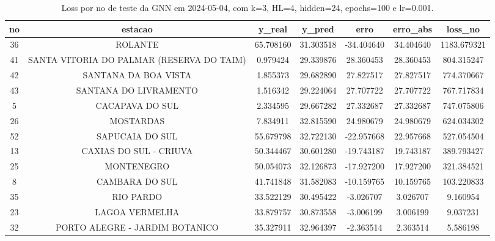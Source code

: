 \begin{table}[h]
\centering
\caption{Loss por no de teste da GNN em 2024-05-04, com k=3, HL=4, hidden=24, epochs=100 e lr=0.001.}
\label{tab:gnn_loss_k3_hl4_h24_e100_d20240504}
\begin{tabular}{ccccccc}
\toprule
no & estacao & y\_real & y\_pred & erro & erro\_abs & loss\_no \\
\midrule
36 & ROLANTE & 65.708160 & 31.303518 & -34.404640 & 34.404640 & 1183.679321 \\
41 & SANTA VITORIA DO PALMAR (RESERVA DO TAIM) & 0.979424 & 29.339876 & 28.360453 & 28.360453 & 804.315247 \\
42 & SANTANA DA BOA VISTA & 1.855373 & 29.682890 & 27.827517 & 27.827517 & 774.370667 \\
43 & SANTANA DO LIVRAMENTO & 1.516342 & 29.224064 & 27.707722 & 27.707722 & 767.717834 \\
5 & CACAPAVA DO SUL & 2.334595 & 29.667282 & 27.332687 & 27.332687 & 747.075806 \\
26 & MOSTARDAS & 7.834911 & 32.815590 & 24.980679 & 24.980679 & 624.034302 \\
52 & SAPUCAIA DO SUL & 55.679798 & 32.722130 & -22.957668 & 22.957668 & 527.054504 \\
13 & CAXIAS DO SUL - CRIUVA & 50.344467 & 30.601280 & -19.743187 & 19.743187 & 389.793427 \\
25 & MONTENEGRO & 50.054073 & 32.126873 & -17.927200 & 17.927200 & 321.384521 \\
8 & CAMBARA DO SUL & 41.741848 & 31.582083 & -10.159765 & 10.159765 & 103.220833 \\
35 & RIO PARDO & 33.522129 & 30.495422 & -3.026707 & 3.026707 & 9.160954 \\
23 & LAGOA VERMELHA & 33.879757 & 30.873558 & -3.006199 & 3.006199 & 9.037231 \\
32 & PORTO ALEGRE - JARDIM BOTANICO & 35.327911 & 32.964397 & -2.363514 & 2.363514 & 5.586198 \\
\bottomrule
\end{tabular}
\end{table}
